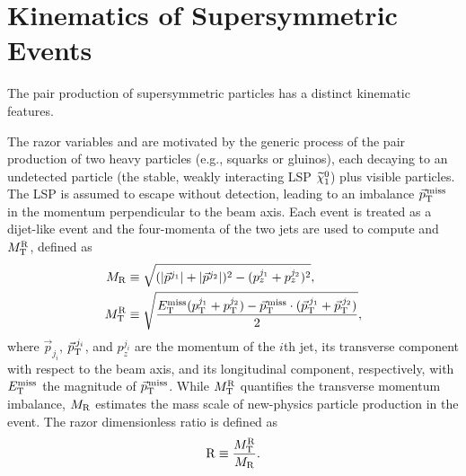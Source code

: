 \chapter{Kinematics of Supersymmetric Events}
\label{ch:kinematic}
The pair production of supersymmetric particles has a distinct
kinematic features.


The razor variables \MR and  \Rtwo are motivated by the generic process of the pair production of two
heavy particles (e.g., squarks or gluinos), each decaying to an
undetected particle (the stable, weakly interacting LSP $\widetilde{\chi}^{0}_1$)
plus visible particles. The LSP is assumed to escape without
detection, leading to an imbalance ${\vec p}_{\mathrm{T}}^{\kern1pt\text{miss}}$ in the momentum
perpendicular to the beam axis. Each event is treated as a dijet-like event
and the four-momenta of the two jets are used to compute \MR and $M_\mathrm{T}^\mathrm{R}$, defined as
\begin{align}
 \label{eq:MRstar}
 M_\mathrm{R} &\equiv
 \sqrt{
(\lvert \vec{p}^{j_{1}} \rvert+\lvert \vec{p}^{j_{2}} \rvert)^2 -({p}^{j_1}_z+{p}^{j_2}_z)^2},\\
M_\mathrm{T}^\mathrm{R} &\equiv \sqrt{ \frac{E_{\mathrm{T}}^{\text{miss}}(p_{\mathrm{T}}^{j_1}+p_{\mathrm{T}}^{j_2}) -
{\vec p}_{\mathrm{T}}^{\kern1pt\text{miss}} \cdot
 ({\vec p}_{\mathrm{T}}^{\,j_1}+{\vec p}_{\mathrm{T}}^{\,j_2}) }{2}},
\end{align}
where $\vec{p}_{j_i}$, ${\vec p}_{\mathrm{T}}^{\,j_i}$, and
$p^{j_i}_z$ are the momentum of the $i$th jet, its
transverse component with respect to the beam axis, and its
longitudinal component, respectively, with $E_{\mathrm{T}}^{\text{miss}}$ the magnitude of ${\vec p}_{\mathrm{T}}^{\kern1pt\text{miss}}$. While
$M_\mathrm{T}^\mathrm{R}$ quantifies the transverse momentum imbalance,
$M_\mathrm{R}$ estimates the mass scale of new-physics particle
production in the event. The razor dimensionless ratio is defined as
\begin{equation}
\mathrm{R} \equiv \frac{M_\mathrm{T}^\mathrm{R}}{M_\mathrm{R}}.
\end{equation}